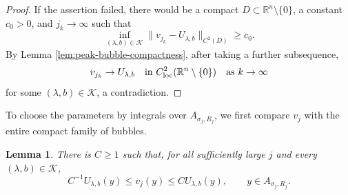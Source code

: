 \documentclass[11pt]{article}
\numberwithin{equation}{section}
\newtheorem{lemma}[theorem]{Lemma}
\theoremstyle{remark}
\newcommand{\R}{\mathbb R}
\newcommand{\norm}[1]{\lVert #1\rVert}
\begin{document}
\par
\begin{proof}
If the assertion failed, there would be a compact
\(D\subset\R^n\setminus\{0\}\), a constant \(c_0>0\), and
\(j_k\to\infty\) such that
\[
 \inf_{(\lambda,b)\in\mathcal K}
 \norm{v_{j_k}-U_{\lambda,b}}_{C^2(D)}\ge c_0.
\]
By Lemma  \ref{lem:peak-bubble-compactness}, after taking a further
subsequence,
\[
 v_{j_k}\to U_{\lambda,b}
 \quad\text{in }C^2_{\rm loc}(\R^n\setminus\{0\})
 \quad\text{as }k\to\infty
\]
for some \((\lambda,b)\in\mathcal K\), a contradiction.
\end{proof}


\par
To choose the parameters by integrals over \(A_{\sigma_j,R_j}\), we first
compare \(v_j\) with the entire compact family of bubbles.
\begin{lemma}\label{lem:annular-bubble-comparison}
There is \(C\ge1\) such that, for all sufficiently large \(j\) and every
\((\lambda,b)\in\mathcal K\),
\[
 C^{-1}U_{\lambda,b}(y)\le v_j(y)
 \le CU_{\lambda,b}(y),\qquad y\in A_{\sigma_j,R_j}.
\]
\end{lemma}
\end{document}
